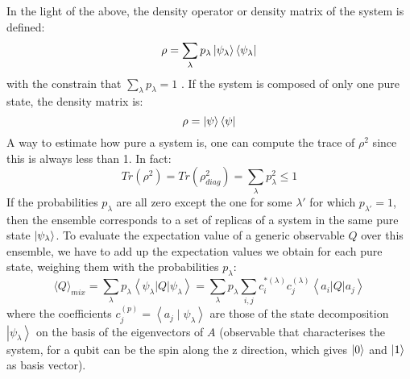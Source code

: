 In the light of the above, the density operator or density matrix of the system is defined: 
\begin{equation}
    \rho = \sum_{\lambda} p_{\lambda} \ket{\psi_{\lambda}}\bra{\psi_{\lambda}} 
    \label{eq:density}
\end{equation}
with the constrain that $\sum_{\lambda} p_{\lambda}=1$
. If the system is composed of only one pure state, the density matrix is: 
\begin{equation}
    \rho = \ket{\psi}\bra{\psi}
\end{equation}
A way to estimate how pure a system is, one can compute the trace of $\rho^2$ since this is always less than 1. In fact: 
\begin{equation*}
    Tr(\rho^2) = Tr(\rho^2_{diag}) = \sum_{\lambda}p^2_{\lambda} \leq 1
\end{equation*}
If the probabilities $p_{\lambda}$ are all zero except the one for some $\lambda'$ for which $p_{\lambda'}=1$, then the ensemble corresponds to a set of replicas of a system in the same pure state $\ket{\psi_{\lambda}}$.
To evaluate the expectation value of a generic observable $Q$ over this ensemble, we have to add up the expectation values we obtain for each pure state, weighing them with the probabilities $p_{\lambda}$:
$$
\langle Q\rangle_{mix}=\sum_{\lambda} p_{\lambda}\left\langle\psi_{\lambda}|Q| \psi_{\lambda}\right\rangle=\sum_{\lambda} p_{\lambda} \sum_{i, j} c_{i}^{*(\lambda)} c_{j}^{(\lambda)}\left\langle a_{i}|Q| a_{j}\right\rangle
$$
where the coefficients  $c_{j}^{(p)}=\left\langle a_{j} \mid \psi_{\lambda}\right\rangle$ are those of the state decomposition $\left|\psi_{\lambda}\right\rangle$ on the basis of the eigenvectors of $A$ (observable that characterises the system, for a qubit can be the spin along the z direction, which gives $\ket{0}$ and $\ket{1}$ as basis vector).
